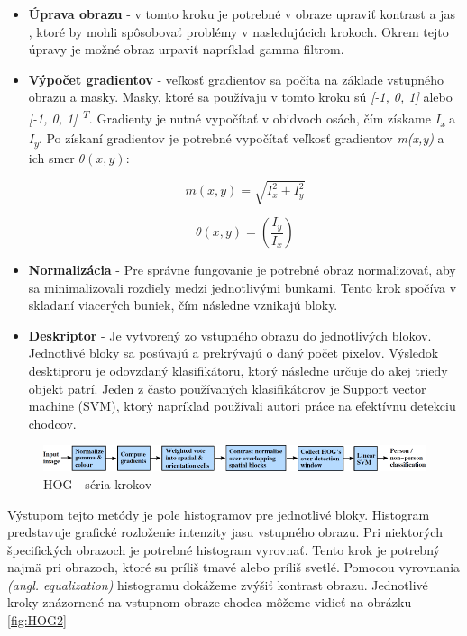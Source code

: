 \documentclass[slovak,master,dept460,male,cpp,cpdeclaration]{diploma}
\begin{document}
\begin{itemize}
  \item \textbf{Úprava obrazu} - v tomto kroku je potrebné  v obraze upraviť kontrast a jas , ktoré by mohli spôsobovať  problémy v nasledujúcich krokoch. Okrem tejto úpravy  je možné  obraz urpaviť napríklad gamma filtrom.
  \item \textbf{Výpočet gradientov} - veľkosť gradientov sa počíta na základe vstupného obrazu a masky. Masky, ktoré sa používaju v tomto kroku sú \textit{[-1, 0, 1]} alebo \textit{[-1, 0, 1] \textsuperscript{T}}. Gradienty je nutné vypočítať v obidvoch osách, čím získame \textit{I\textsubscript{x}} a \textit{I\textsubscript{y}}. Po získaní gradientov je potrebné vypočítať veľkosť gradientov \textit{m(x,y)} a ich smer \textit{$\theta(x, y)$}:
  
\begin{equation}
m(x,y)= \sqrt{I_{x}^{2} + I_{y}^{2}}
\label{eq:Výpočet veľkosti gradientu}
\end{equation}

  \begin{equation}
\theta(x, y) = \left(\frac{I_{y}}{I_{x}}\right)
\label{eq:Výpočet smeru gradientu}
\end{equation}
  \item \textbf{Normalizácia} -  Pre správne fungovanie je potrebné obraz normalizovať, aby sa minimalizovali rozdiely medzi jednotlivými bunkami. Tento krok spočíva v skladaní viacerých buniek, čím následne vznikajú bloky. 
   \item \textbf{Deskriptor} -  Je vytvorený zo vstupného obrazu do jednotlivých blokov. Jednotlivé bloky sa posúvajú a prekrývajú o daný počet pixelov. Výsledok desktiproru je odovzdaný  klasifikátoru, ktorý následne určuje do akej triedy objekt patrí. Jeden z často používaných klasifikátorov je Support vector machine (SVM), ktorý napríklad používali autori práce na efektívnu detekciu chodcov.\cite{pang2011efficient}
 \end{itemize}


\begin{figure}[H]
	\centering
	\includegraphics[width=1\textwidth]{Figures/hog.png}
	\caption{HOG - séria krokov \cite{dalal2005}}
	\label{fig:HOG1}
\end{figure}

Výstupom tejto metódy je pole histogramov pre jednotlivé bloky. Histogram predstavuje grafické rozloženie intenzity jasu vstupného obrazu. Pri niektorých špecifických obrazoch je potrebné histogram vyrovnať. Tento krok je potrebný najmä pri obrazoch, ktoré su príliš tmavé alebo príliš svetlé. Pomocou vyrovnania \textit{(angl. equalization)} histogramu  dokážeme zvýšiť kontrast obrazu. Jednotlivé kroky znázornené na vstupnom obraze chodca môžeme vidieť na obrázku \ref{fig:HOG2}\par
\end{document}
